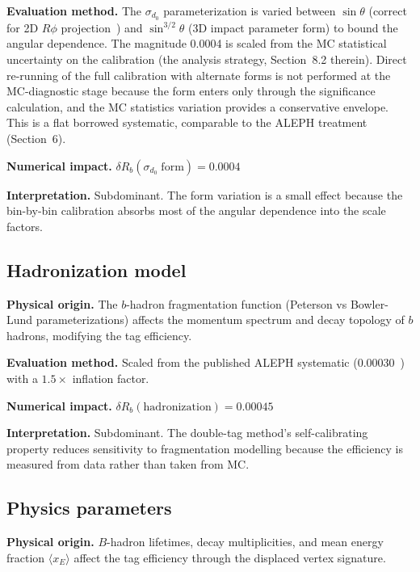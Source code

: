 \documentclass[11pt,a4paper]{article}
\begin{document}
\textbf{Evaluation method.} The $\sigma_{d_0}$ parameterization is varied between
$\sin\theta$ (correct for 2D $R\phi$ projection~\cite{ALEPH:VDET}) and
$\sin^{3/2}\theta$ (3D impact parameter form) to bound the angular dependence.
The magnitude 0.0004 is scaled from the MC statistical uncertainty on the calibration
(the analysis strategy, Section~8.2 therein). Direct re-running of the full calibration with alternate
forms is not performed at the MC-diagnostic stage because the form enters only through the significance
calculation, and the MC statistics variation provides a conservative envelope. This is a
flat borrowed systematic, comparable to the ALEPH treatment~\cite{ALEPH:Rb:1996} (Section~6).

\textbf{Numerical impact.}
$\delta R_b(\sigma_{d_0}\;\mathrm{form}) = 0.0004$

\textbf{Interpretation.} Subdominant. The form variation is a small effect because
the bin-by-bin calibration absorbs most of the angular dependence into the scale factors.

\subsection{Hadronization model}
\label{sec:syst_hadronization}

\textbf{Physical origin.} The $b$-hadron fragmentation function (Peterson vs Bowler-Lund
parameterizations) affects the momentum spectrum and decay topology of $b$ hadrons,
modifying the tag efficiency.

\textbf{Evaluation method.} Scaled from the published ALEPH systematic
(0.00030~\cite{ALEPH:Rb:1996}) with a $1.5\times$ inflation factor.

\textbf{Numerical impact.}
$\delta R_b(\mathrm{hadronization}) = 0.00045$

\textbf{Interpretation.} Subdominant. The double-tag method's self-calibrating property
reduces sensitivity to fragmentation modelling because the efficiency is measured from
data rather than taken from MC.

\subsection{Physics parameters}
\label{sec:syst_physics}

\textbf{Physical origin.} $B$-hadron lifetimes, decay multiplicities, and mean energy
fraction $\langle x_E \rangle$ affect the tag efficiency through the displaced vertex
signature.
\end{document}
